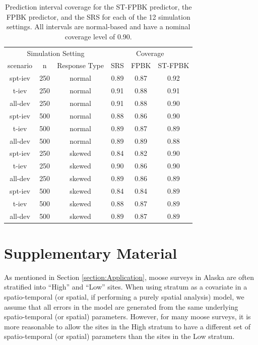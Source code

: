 \documentclass[smallextended]{svjour3}       %
\begin{document}
\begin{table}[H]

\caption{\label{tab:simpitab}Prediction interval coverage for the ST-FPBK predictor, the FPBK predictor, and the SRS for each of the 12 simulation settings. All intervals are normal-based and have a nominal coverage level of 0.90.}
\centering
\begin{tabular}[t]{cccccc}
\toprule
\multicolumn{3}{c}{Simulation Setting} & \multicolumn{3}{c}{Coverage} \\
\cmidrule(l{3pt}r{3pt}){1-3} \cmidrule(l{3pt}r{3pt}){4-6}
scenario & n & Response Type & SRS & FPBK & ST-FPBK\\
\midrule
spt-iev & 250 & normal & 0.89 & 0.87 & 0.92\\
t-iev & 250 & normal & 0.91 & 0.88 & 0.91\\
all-dev & 250 & normal & 0.91 & 0.88 & 0.90\\
\midrule
spt-iev & 500 & normal & 0.88 & 0.86 & 0.90\\
t-iev & 500 & normal & 0.89 & 0.87 & 0.89\\
all-dev & 500 & normal & 0.89 & 0.89 & 0.88\\
\midrule
spt-iev & 250 & skewed & 0.84 & 0.82 & 0.90\\
t-iev & 250 & skewed & 0.90 & 0.86 & 0.90\\
all-dev & 250 & skewed & 0.89 & 0.86 & 0.89\\
\midrule
spt-iev & 500 & skewed & 0.84 & 0.84 & 0.89\\
t-iev & 500 & skewed & 0.88 & 0.87 & 0.89\\
all-dev & 500 & skewed & 0.89 & 0.87 & 0.89\\
\bottomrule
\end{tabular}
\end{table}

\hypertarget{suppmaterial}{%
\section*{Supplementary Material}\label{suppmaterial}}

As mentioned in Section \ref{section:Application}, moose surveys in
Alaska are often stratified into ``High'' and ``Low'' sites. When using
stratum as a covariate in a spatio-temporal (or spatial, if performing a
purely spatial analysis) model, we assume that all errors in the model
are generated from the same underlying spatio-temporal (or spatial)
parameters. However, for many moose surveys, it is more reasonable to
allow the sites in the High stratum to have a different set of
spatio-temporal (or spatial) parameters than the sites in the Low
stratum.
\end{document}
